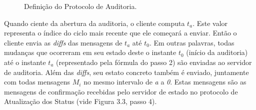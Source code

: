 \begin{figure}[h!]
	\begin{center}

	\caption[Definição do Protocolo de Auditoria.]{Definição do Protocolo de Auditoria.}

	\label{fig:auditoria}
	
	\end{center}
\end{figure}

Quando ciente da abertura da auditoria, o cliente computa $t_a$. Este valor representa o índice do ciclo mais recente que ele começará a enviar. Então o cliente envia as \textit{diffs} das mensagens de $t_a$ até $t_0$. Em outras palavras, todas mudanças que ocorreram em seu estado deste o instante $t_0$ (início da auditoria) até o instante $t_a$ (representado pela fórmula do passo 2) são enviadas ao servidor de auditoria. Além das \textit{diffs}, seu estato concreto também é enviado, juntamente com todas mensagens $M_i$ no mesmo intervalo de \textit{a} a \textit{0}. Estas mensagens são as mensagens de confirmação recebidas pelo servidor de estado no protocolo de Atualização dos Status (vide Figura 3.3, passo 4).

